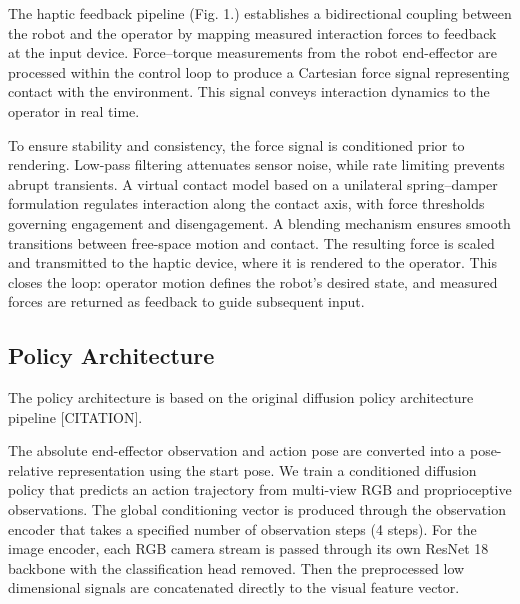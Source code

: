 \documentclass[letterpaper, 10 pt, conference]{ieeeconf}  %
\begin{document}
The haptic feedback pipeline (Fig. 1.) establishes a bidirectional coupling between the robot and the operator by mapping measured interaction forces to feedback at the input device. Force–torque measurements from the robot end-effector are processed within the control loop to produce a Cartesian force signal representing contact with the environment. This signal conveys interaction dynamics to the operator in real time.

To ensure stability and consistency, the force signal is conditioned prior to rendering. Low-pass filtering attenuates sensor noise, while rate limiting prevents abrupt transients. A virtual contact model based on a unilateral spring–damper formulation regulates interaction along the contact axis, with force thresholds governing engagement and disengagement. A blending mechanism ensures smooth transitions between free-space motion and contact. The resulting force is scaled and transmitted to the haptic device, where it is rendered to the operator. This closes the loop: operator motion defines the robot’s desired state, and measured forces are returned as feedback to guide subsequent input.


\subsection{Policy Architecture}
The policy architecture is based on the original diffusion policy architecture pipeline [CITATION]. 

The absolute end-effector observation and action pose are converted into a pose-relative representation using the start pose. We train a conditioned diffusion policy that predicts an action trajectory from multi-view RGB and proprioceptive observations. 
The global conditioning vector is produced through the observation encoder that takes a specified number of observation steps (4 steps). For the image encoder, each RGB camera stream is passed through its own ResNet 18 backbone with the classification head removed. Then the preprocessed low dimensional signals are concatenated directly to the visual feature vector.
\end{document}
